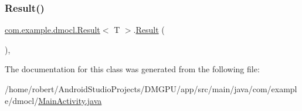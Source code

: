 \subsubsection{\texorpdfstring{Result()}{Result()}}
{\footnotesize\ttfamily \mbox{\hyperlink{classcom_1_1example_1_1dmocl_1_1Result}{com.\+example.\+dmocl.\+Result}}$<$ T $>$.\mbox{\hyperlink{classcom_1_1example_1_1dmocl_1_1Result}{Result}} (\begin{DoxyParamCaption}{ }\end{DoxyParamCaption})\hspace{0.3cm}{\ttfamily [inline]}, {\ttfamily [private]}}



The documentation for this class was generated from the following file\+:\begin{DoxyCompactItemize}
\item 
/home/robert/\+Android\+Studio\+Projects/\+D\+M\+G\+P\+U/app/src/main/java/com/example/dmocl/\mbox{\hyperlink{MainActivity_8java}{Main\+Activity.\+java}}\end{DoxyCompactItemize}
